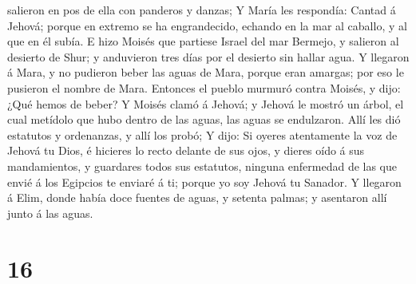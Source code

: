 salieron en pos de ella con panderos y danzas;  Y María les
respondía: Cantad á Jehová; porque en extremo se ha engrandecido,
echando en la mar al caballo, y al que en él subía.  E hizo
Moisés que partiese Israel del mar Bermejo, y salieron al desierto de
Shur; y anduvieron tres días por el desierto sin hallar agua.
 Y llegaron á Mara, y no pudieron beber las aguas de Mara,
porque eran amargas; por eso le pusieron el nombre de Mara.
 Entonces el pueblo murmuró contra Moisés, y dijo: ¿Qué
hemos de beber?  Y Moisés clamó á Jehová; y Jehová le
mostró un árbol, el cual metídolo que hubo dentro de las aguas, las
aguas se endulzaron. Allí les dió estatutos y ordenanzas, y allí los
probó;  Y dijo: Si oyeres atentamente la voz de Jehová tu
Dios, é hicieres lo recto delante de sus ojos, y dieres oído á sus
mandamientos, y guardares todos sus estatutos, ninguna enfermedad de las
que envié á los Egipcios te enviaré á ti; porque yo soy Jehová tu
Sanador.  Y llegaron á Elim, donde había doce fuentes de
aguas, y setenta palmas; y asentaron allí junto á las aguas.

\hypertarget{section-15}{%
\section{16}\label{section-15}}

